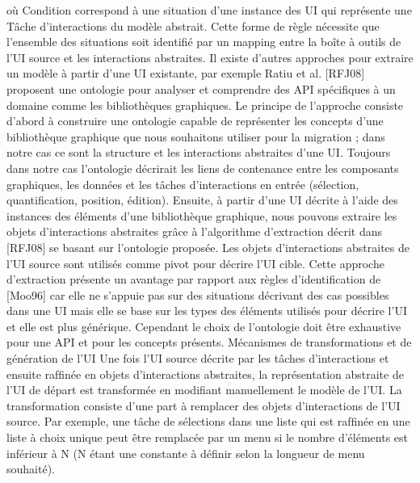 \documentclass{article}
\begin{document}
o\`{u} Condition correspond \`{a} une situation d’une instance des UI qui repr\'{e}sente une T\^{a}che d’interactions du mod\`{e}le abstrait. Cette forme de r\`{e}gle n\'{e}cessite que l’ensemble des situations soit identiﬁ\'{e}
par un mapping entre la bo\^{i}te \`{a} outils de l’UI source et les interactions abstraites.
Il existe d’autres approches pour extraire un mod\`{e}le \`{a} partir d’une UI existante, par exemple
Ratiu et al. [RFJ08] proposent une ontologie pour analyser et comprendre des API sp\'{e}ciﬁques \`{a} un
domaine comme les biblioth\`{e}ques graphiques. Le principe de l’approche consiste d’abord \`{a} construire
une ontologie capable de repr\'{e}senter les concepts d’une biblioth\`{e}que graphique que nous souhaitons
utiliser pour la migration ; dans notre cas ce sont la structure et les interactions abstraites d’une UI.
Toujours dans notre cas l’ontologie d\'{e}crirait les liens de contenance entre les composants graphiques,
les donn\'{e}es et les t\^{a}ches d’interactions en entr\'{e}e (s\'{e}lection, quantiﬁcation, position, \'{e}dition).
Ensuite, \`{a} partir d’une UI d\'{e}crite \`{a} l’aide des instances des \'{e}l\'{e}ments d’une biblioth\`{e}que graphique, nous pouvons extraire les objets d’interactions abstraites gr\^{a}ce \`{a} l’algorithme d’extraction
d\'{e}crit dans [RFJ08] se basant sur l’ontologie propos\'{e}e. Les objets d’interactions abstraites de l’UI
source sont utilis\'{e}s comme pivot pour d\'{e}crire l’UI cible.
Cette approche d’extraction pr\'{e}sente un avantage par rapport aux r\`{e}gles d’identiﬁcation de
[Moo96] car elle ne s’appuie pas sur des situations d\'{e}crivant des cas possibles dans une UI mais
elle se base sur les types des \'{e}l\'{e}ments utilis\'{e}s pour d\'{e}crire l’UI et elle est plus g\'{e}n\'{e}rique. Cependant
le choix de l’ontologie doit \^{e}tre exhaustive pour une API et pour les concepts pr\'{e}sents.
M\'{e}canismes de transformations et de g\'{e}n\'{e}ration de l’UI
Une fois l’UI source d\'{e}crite par les
t\^{a}ches d’interactions et ensuite rafﬁn\'{e}e en objets d’interactions abstraites, la repr\'{e}sentation abstraite
de l’UI de d\'{e}part est transform\'{e}e en modiﬁant manuellement le mod\`{e}le de l’UI.
La transformation consiste d’une part \`{a} remplacer des objets d’interactions de l’UI source. Par
exemple, une t\^{a}che de s\'{e}lections dans une liste qui est rafﬁn\'{e}e en une liste \`{a} choix unique peut \^{e}tre
remplac\'{e}e par un menu si le nombre d’\'{e}l\'{e}ments est inf\'{e}rieur \`{a} N (N \'{e}tant une constante \`{a} d\'{e}ﬁnir selon
la longueur de menu souhait\'{e}).
\end{document}
